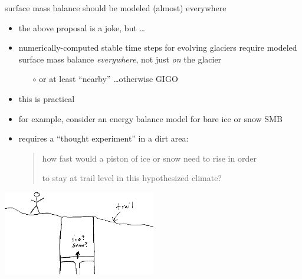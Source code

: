 \documentclass[10pt,hyperref,dvipsnames]{beamer}
\begin{document}
\begin{frame}{surface mass balance should be modeled (almost) everywhere}
\begin{itemize}
\item the above proposal is a joke, but \dots
\item numerically-computed stable time steps for evolving glaciers require modeled surface mass balance \emph{everywhere}, not just \emph{on} the glacier
    \begin{itemize}
    \item[$\circ$] or at least ``nearby'' \dots otherwise GIGO
    \end{itemize}
\item this is practical
\item for example, consider an energy balance model for bare ice or snow SMB
\item requires a ``thought experiment'' in a dirt area:

\begin{quotation}
how fast would a piston of ice or snow need to rise in order

to stay at trail level in this hypothesized climate?
\end{quotation}
\end{itemize}

\begin{center}
\includegraphics[width=0.5\textwidth]{figs/pistontrail.png}
\end{center}
\end{frame}
\end{document}
